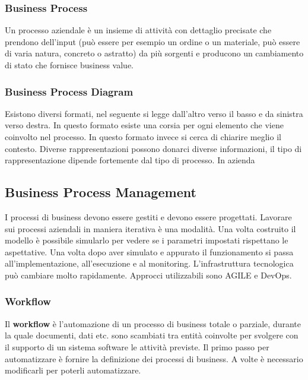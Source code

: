 \subsubsection{Business Process}
Un processo aziendale è un insieme di attività con dettaglio precisate che prendono dell'input (può essere per esempio un ordine o un materiale, può essere di varia natura, concreto o astratto) da più sorgenti e producono un cambiamento di stato che fornisce business value.
\subsubsection{Business Process Diagram}
\noindent Esistono diversi formati, nel seguente si legge dall'altro verso il basso e da sinistra verso destra.
\noindent In questo formato esiste una corsia per ogni elemento che viene coinvolto nel processo.
\noindent In questo formato invece si cerca di chiarire meglio il contesto.
\noindent Diverse rappresentazioni possono donarci diverse informazioni, il tipo di rappresentazione dipende fortemente dal tipo di processo. In azienda
\subsection{Business Process Management}
I processi di business devono essere gestiti e devono essere progettati. Lavorare sui processi aziendali in maniera iterativa è una modalità. Una volta costruito il modello è possibile simularlo per vedere se i parametri impostati rispettano le aspettative. Una volta dopo aver simulato e appurato il funzionamento si passa all'implementazione, all'esecuzione e al monitoring. L'infrastruttura tecnologica può cambiare molto rapidamente. Approcci utilizzabili sono AGILE e DevOps.

\subsubsection{Workflow}
Il \textbf{workflow} è l'automazione di un processo di business totale o parziale, durante la quale documenti, dati etc. sono scambiati tra entità coinvolte per svolgere con il supporto di un sistema software le attività previste.\newline
Il primo passo per automatizzare è fornire la definizione dei processi di business. A volte è necessario modificarli per poterli automatizzare.


